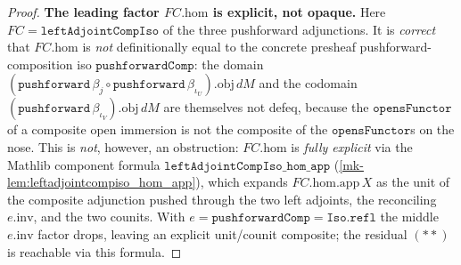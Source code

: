\begin{proof}
  \textbf{The leading factor \(FC.\mathrm{hom}\) is explicit, not opaque.} Here
  \(FC = \mathtt{leftAdjointCompIso}\) of the three pushforward adjunctions. It is \emph{correct} that
  \(FC.\mathrm{hom}\) is \emph{not} definitionally equal to the concrete presheaf pushforward-composition
  iso \(\mathtt{pushforwardComp}\): the domain
  \((\mathtt{pushforward}\,\beta_j \circ \mathtt{pushforward}\,\beta_{\iota_U}).\mathrm{obj}\,dM\) and the
  codomain \((\mathtt{pushforward}\,\beta_{\iota_V}).\mathrm{obj}\,dM\) are themselves not defeq, because
  the \(\mathtt{opensFunctor}\) of a composite open immersion is not the composite of the
  \(\mathtt{opensFunctor}\)s on the nose. This is \emph{not}, however, an obstruction: \(FC.\mathrm{hom}\)
  is \emph{fully explicit} via the Mathlib component formula
  \(\mathtt{leftAdjointCompIso\_hom\_app}\) (\ref{mk-lem:leftadjointcompiso_hom_app}), which expands
  \(FC.\mathrm{hom}.\mathrm{app}\,X\) as the unit of the composite adjunction pushed through the two left
  adjoints, the reconciling \(e.\mathrm{inv}\), and the two counits. With
  \(e = \mathtt{pushforwardComp} = \mathtt{Iso.refl}\) the middle \(e.\mathrm{inv}\) factor drops, leaving
  an explicit unit/counit composite; the residual \((**)\) is reachable via this formula.


\end{proof}
